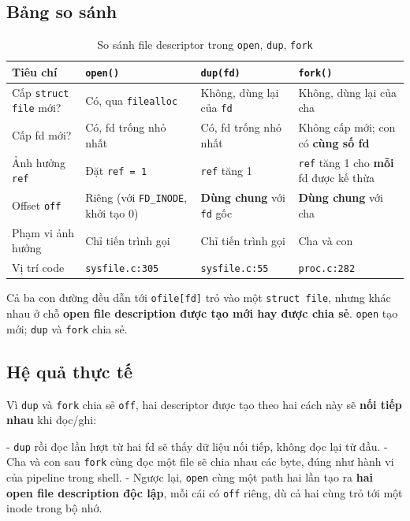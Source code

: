 \subsection{Bảng so sánh}

\begin{table}[H]
    \centering
    \renewcommand{\arraystretch}{1.3}
    \setlength{\tabcolsep}{6pt}
    \begin{tabular}{|p{4cm}|p{4cm}|p{4cm}|p{4cm}|}
        \hline
        \rowcolor[rgb]{0.8, 0.9, 1.0}
        \textbf{Tiêu chí} & \textbf{\texttt{open()}} & \textbf{\texttt{dup(fd)}} & \textbf{\texttt{fork()}} \\ \hline
        Cấp \texttt{struct file} mới? & Có, qua \texttt{filealloc} & Không, dùng lại của \texttt{fd} & Không, dùng lại của cha \\ \hline
        Cấp fd mới? & Có, fd trống nhỏ nhất & Có, fd trống nhỏ nhất & Không cấp mới; con có \textbf{cùng số fd} \\ \hline
        Ảnh hưởng \texttt{ref} & Đặt \texttt{ref = 1} & \texttt{ref} tăng 1 & \texttt{ref} tăng 1 cho \textbf{mỗi} fd được kế thừa \\ \hline
        Offset \texttt{off} & Riêng (với \texttt{FD\_INODE}, khởi tạo 0) & \textbf{Dùng chung} với \texttt{fd} gốc & \textbf{Dùng chung} với cha \\ \hline
        Phạm vi ảnh hưởng & Chỉ tiến trình gọi & Chỉ tiến trình gọi & Cha và con \\ \hline
        Vị trí code & \texttt{sysfile.c:305} & \texttt{sysfile.c:55} & \texttt{proc.c:282} \\ \hline
    \end{tabular}
    \caption{So sánh file descriptor trong \texttt{open}, \texttt{dup}, \texttt{fork}}
\end{table}

Cả ba con đường đều dẫn tới \texttt{ofile[fd]} trỏ vào một \texttt{struct file}, nhưng khác nhau ở chỗ \textbf{open file description được tạo mới hay được chia sẻ}. \texttt{open} tạo mới; \texttt{dup} và \texttt{fork} chia sẻ.

\subsection{Hệ quả thực tế}

Vì \texttt{dup} và \texttt{fork} chia sẻ \texttt{off}, hai descriptor được tạo theo hai cách này sẽ \textbf{nối tiếp nhau} khi đọc/ghi:

- \texttt{dup} rồi đọc lần lượt từ hai fd sẽ thấy dữ liệu nối tiếp, không đọc lại từ đầu.
- Cha và con sau \texttt{fork} cùng đọc một file sẽ chia nhau các byte, đúng như hành vi của pipeline trong shell.
- Ngược lại, \texttt{open} cùng một path hai lần tạo ra \textbf{hai open file description độc lập}, mỗi cái có \texttt{off} riêng, dù cả hai cùng trỏ tới một inode trong bộ nhớ.

